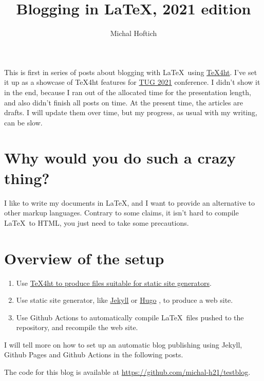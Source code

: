 \documentclass{article}
\title{Blogging in LaTeX, 2021 edition}
\author{Michal Hoftich}
\begin{document}
\maketitle



This is first in series of posts about blogging with \LaTeX\ using
\href{https://tug.org/tex4ht/}{\TeX4ht}. I've set it up as a showcase of
\TeX4ht features for \href{https://tug.org/tug2021/}{TUG 2021} conference.
I didn't show it in the end, because I ran out of the allocated time 
for the presentation length, and also didn't finish all posts on time. 
At the present time, the articles are drafts. I will update them over time,
but my progress, as usual with my writing, can be slow.

\tableofcontents

\section{Why would you do such a crazy thing?}

I like to write my documents in \LaTeX, and I want to provide an alternative
to other markup languages. Contrary to some claims, it isn't hard to compile
\LaTeX\ to HTML, you just need to take some precautions.


\section{Overview of the setup}

\begin{enumerate}
\item Use \href{/testblog/2021/07/30/how-to-blog-with-tex4ht.html}
{\TeX4ht to produce files suitable for static site generators}.
\item Use static site generator, like \href{https://jekyllrb.com/}{Jekyll}
or \href{https://gohugo.io/}{Hugo}
, to produce a web site.
\item Use Github Actions to automatically compile \LaTeX\ files pushed
to the repository, and recompile the web site. 
\end{enumerate}

I will tell more on how to set up an automatic
blog publishing using Jekyll, Github Pages and Github Actions in the following posts.

The code for this blog is available at
\url{https://github.com/michal-h21/testblog}.
\end{document}
